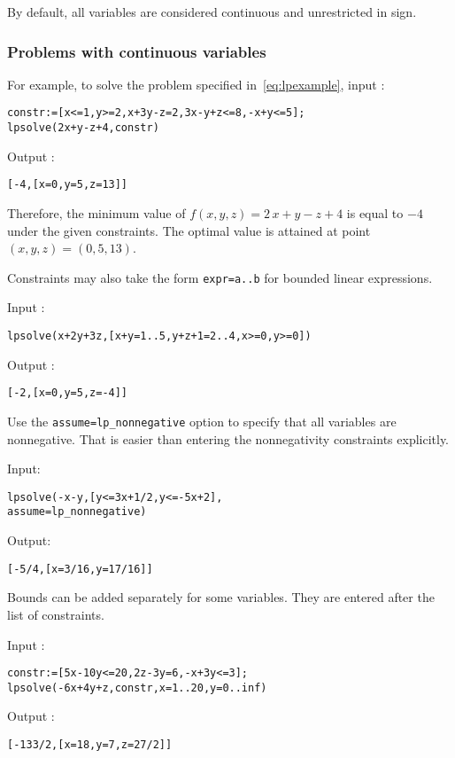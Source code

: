 \documentclass[a4paper,11pt]{book}
\begin{document}
By default, all variables are considered continuous and unrestricted in sign.

\subsubsection{Problems with continuous variables}
For example, to solve the problem specified in~\eqref{eq:lpexample}, input :
\begin{center}
{\tt constr:=[x<=1,y>=2,x+3y-z=2,3x-y+z<=8,-x+y<=5];}\\
{\tt lpsolve(2x+y-z+4,constr)}
\end{center}
Output :
\begin{center}
\tt [-4,[x=0,y=5,z=13]]
\end{center}
Therefore, the minimum value of $ f(x,y,z)=2\,x+y-z+4 $ is equal to $ -4 $ under the given constraints. The optimal value is attained at point $ (x,y,z)=(0,5,13) $.

Constraints may also take the form {\tt expr=a..b} for bounded linear expressions.

\noindent Input :
\begin{center}
{\tt lpsolve(x+2y+3z,[x+y=1..5,y+z+1=2..4,x>=0,y>=0])}
\end{center}
Output :
\begin{center}
{\tt [-2,[x=0,y=5,z=-4]]}
\end{center}

Use the {\tt assume=lp\_nonnegative} option to specify that all variables are nonnegative. That is easier than entering the nonnegativity constraints explicitly.

\noindent Input:
\begin{center}
{\tt lpsolve(-x-y,[y<=3x+1/2,y<=-5x+2],}\\
{\tt assume=lp\_nonnegative)}
\end{center}
Output:
\begin{center}
{\tt [-5/4,[x=3/16,y=17/16]]}
\end{center}

Bounds can be added separately for some variables. They are entered after the list of constraints.

\noindent Input :
\begin{center}
{\tt constr:=[5x-10y<=20,2z-3y=6,-x+3y<=3];}\\
{\tt lpsolve(-6x+4y+z,constr,x=1..20,y=0..inf)}
\end{center}
Output :
\begin{center}
{\tt [-133/2,[x=18,y=7,z=27/2]]}
\end{center}
\end{document}
